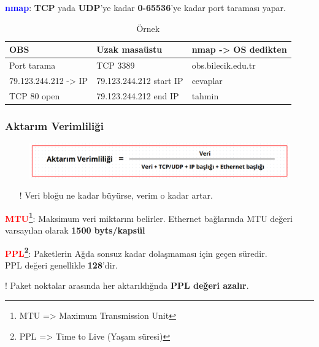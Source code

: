 \textbf{\textcolor{blue}{nmap}}: \textbf{TCP} yada \textbf{UDP}'ye kadar \textbf{0-65536}'ye kadar port taraması yapar.


\begin{table}[ht]
	\centering
	\begin{tabular}{lll}

		\textbf{OBS}       & \textbf{Uzak masaüstu}  & \textbf{nmap -> OS dedikten } \\
		\hline
		Port tarama          & TCP 3389                & obs.bilecik.edu.tr            \\
		79.123.244.212 -> IP & 79.123.244.212 start IP & cevaplar                      \\
		TCP 80 open          & 79.123.244.212 end IP   & tahmin                        \\

	\end{tabular}
	\caption{Örnek}\label{tab:table}
\end{table}

\subsubsection{Aktarım Verimliliği}
\begin{figure}[!ht]
	\centering
	\includegraphics[width=17cm]{images/transmission_example}
\end{figure}

\begin{enumerate}
	\item[!] Veri bloğu ne kadar büyürse, verim o kadar artar.
\end{enumerate}

\textbf{\textcolor{red}{MTU\footnote{MTU => Maximum Transmission Unit}}}: Maksimum veri miktarını belirler. 
Ethernet bağlarında MTU değeri varsayılan olarak \textbf{1500 byts/kapsül}

\textbf{\textcolor{red}{PPL\footnote{PPL => Time to Live (Yaşam süresi)}}}: Paketlerin Ağda sonsuz kadar dolaşmaması için geçen süredir.\\
PPL değeri genellikle \textbf{128}'dir.

! Paket noktalar arasında her aktarıldığnda \textbf{PPL değeri azalır}.
